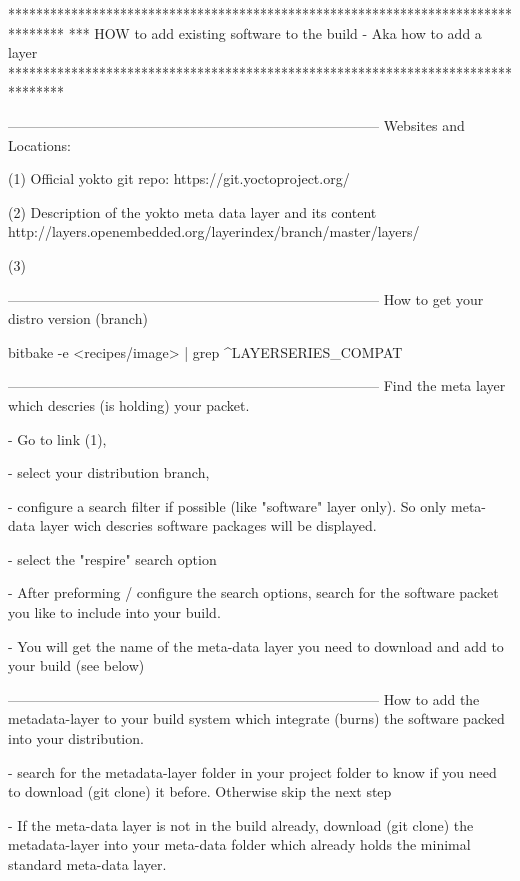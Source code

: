 
********************************************************************************
*** HOW to add existing software to the build -  Aka how to add a layer
********************************************************************************


--------------------------------------------------------------------------------
Websites and Locations:


(1) Official yokto git repo:
    https://git.yoctoproject.org/


(2) Description of the yokto meta data layer and its content
        http://layers.openembedded.org/layerindex/branch/master/layers/

(3)


--------------------------------------------------------------------------------
How to get your distro version (branch)

    bitbake -e <recipes/image> | grep ^LAYERSERIES_COMPAT



--------------------------------------------------------------------------------
Find the meta layer which descries (is holding) your packet.


- Go to link (1),

- select your distribution branch,

- configure a search filter if possible (like "software" layer only). So only
    meta-data layer wich descries software packages will be displayed.

- select the "respire" search option

- After preforming / configure the search options, search for the software
    packet you like to include into your build.

- You will get the name of the meta-data layer you need to download and add to
    your build (see below)


--------------------------------------------------------------------------------
How to add the metadata-layer to your build system which integrate (burns)
the software packed into your distribution.

- search for the metadata-layer folder in your project folder to know if you
    need to download (git clone) it before. Otherwise skip the next step

- If the meta-data layer is not in the build already, download (git clone)
    the metadata-layer into your meta-data folder which already holds the
    minimal standard meta-data layer.

